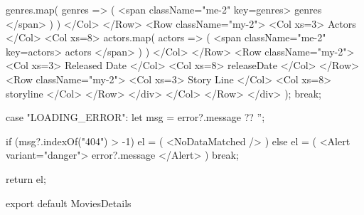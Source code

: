 {{{                                            genres.map(
                                                genres => (
                                                    <span className="me-2"
                                                        key={genres}>
                                                        {genres}
                                                    </span>
                                                )
                                            )
                                        }
                                    </Col>
                                </Row>
                                <Row className="my-2">
                                    <Col xs={3}>
                                        Actors
                                    </Col>
                                    <Col xs={8}>
                                        {
                                            actors.map(
                                                actors => (
                                                    <span className="me-2"
                                                        key={actors}>
                                                        {actors}
                                                    </span>
                                                )
                                            )
                                        }
                                    </Col>
                                </Row>
                                <Row className="my-2">
                                    <Col xs={3}>
                                        Released Date
                                    </Col>
                                    <Col xs={8}>
                                        {releaseDate}
                                    </Col>
                                </Row>
                                <Row className="my-2">
                                    <Col xs={3}>
                                        Story Line
                                    </Col>
                                    <Col xs={8}>
                                        {storyline}
                                    </Col>
                                </Row>
                            </div>
                        </Col>
                    </Row>
                </div>
            );
            break;

        case "LOADING_ERROR":
            let msg = error?.message ?? '';

            if (msg?.indexOf("404") > -1) {
                el = (
                    <NoDataMatched />
                )
            } else {
                el = (
                    <Alert variant="danger">
                        {error?.message}
                    </Alert>
                )
            }
            break;
    }

    return el;
}

export default MoviesDetails